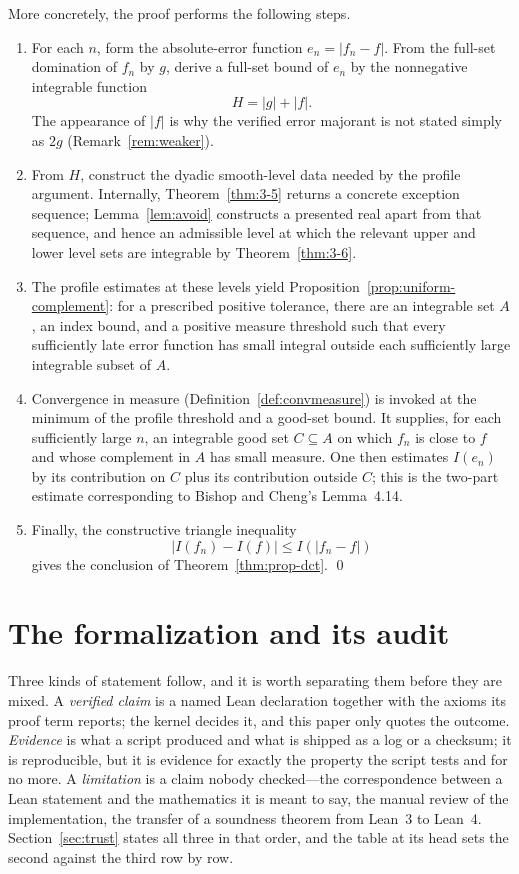 \documentclass[11pt]{article}
\theoremstyle{definition}
\theoremstyle{remark}
\begin{document}
More concretely, the proof performs the following steps.
\begin{enumerate}[label=(\arabic*)]
\item For each $n$, form the absolute-error function $e_n=|f_n-f|$.  From the full-set domination of $f_n$ by $g$, derive a full-set bound of $e_n$ by the nonnegative integrable function
\[
H=|g|+|f|.
\]
The appearance of $|f|$ is why the verified error majorant is not stated simply as $2g$ (Remark~\ref{rem:weaker}).

\item From $H$, construct the dyadic smooth-level data needed by the profile argument.  Internally, Theorem~\ref{thm:3-5} returns a concrete exception sequence; Lemma~\ref{lem:avoid} constructs a presented real apart from that sequence, and hence an admissible level at which the relevant upper and lower level sets are integrable by Theorem~\ref{thm:3-6}.

\item The profile estimates at these levels yield Proposition~\ref{prop:uniform-complement}: for a prescribed positive tolerance, there are an integrable set $A$, an index bound, and a positive measure threshold such that every sufficiently late error function has small integral outside each sufficiently large integrable subset of $A$.

\item Convergence in measure (Definition~\ref{def:convmeasure}) is invoked at the minimum of the profile threshold and a good-set bound.  It supplies, for each sufficiently large $n$, an integrable good set $C\subseteq A$ on which $f_n$ is close to $f$ and whose complement in $A$ has small measure.  One then estimates $I(e_n)$ by its contribution on $C$ plus its contribution outside $C$; this is the two-part estimate corresponding to Bishop and Cheng's Lemma~4.14.

\item Finally, the constructive triangle inequality
\[
|I(f_n)-I(f)|\leq I(|f_n-f|)
\]
gives the conclusion of Theorem~\ref{thm:prop-dct}. \qed
\end{enumerate}

\part{The formalization and its audit}

\noindent Three kinds of statement follow, and it is worth separating them before
they are mixed.  A \emph{verified claim} is a named Lean declaration together with
the axioms its proof term reports; the kernel decides it, and this paper only quotes
the outcome.  \emph{Evidence} is what a script produced and what is shipped as a log
or a checksum; it is reproducible, but it is evidence for exactly the property the
script tests and for no more.  A \emph{limitation} is a claim nobody checked---the
correspondence between a Lean statement and the mathematics it is meant to say, the
manual review of the implementation, the transfer of a soundness theorem from Lean~3
to Lean~4.  Section~\ref{sec:trust} states all three in that order, and the table at
its head sets the second against the third row by row.
\end{document}
